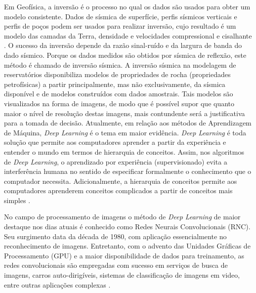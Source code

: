 Em Geofísica, a inversão é o processo no qual os dados são usados para obter um modelo
consistente. Dados de sísmica de superfície, perfis sísmicos verticais e
perfis de poços podem ser usados para realizar inversão, cujo
resultado é um modelo das camadas da Terra, densidade e velocidades compressional
e cisalhante \citep{WinNT}. O sucesso da inversão depende da razão sinal-ruído e da
largura de banda do dado sísmico. Porque os dados medidos são obtidos por sísmica de reflexão,
este método é chamado de inversão sísmica. A inversão sísmica na
modelagem de reservatórios disponibiliza modelos de propriedades de rocha
(propriedades petrofísicas) a partir principalmente, mas não exclusivamente,
da sísmica disponível e de modelos construídos com dados amostrais. Tais modelos
são visualizados na forma de imagens, de modo que é possível supor que quanto maior
o nível de resolução destas imagens, mais contundente será a justificativa para a tomada de decisão.
%
Atualmente, em relação aos métodos de Aprendizagem de Máquina, \textit{Deep Learning} é o tema em
maior evidência. \textit{Deep Learning} é toda solução que permite aos
computadores aprender a partir da experiência e entender o mundo em
termos de hierarquia de conceitos.
Assim, nos algoritmos de \textit{Deep Learning}, o aprendizado
por experiência (supervisionado) evita a interferência
humana no sentido de especificar formalmente o conhecimento que o computador necessita.
Adicionalmente, a hierarquia de conceitos permite aos computadores aprenderem
conceitos complicados a partir de conceitos mais simples \citep{Gdfl16}.

No campo de
processamento de imagens o método de \textit{Deep Learning} de
maior destaque nos dias atuais é conhecido
como Redes Neurais Convolucionais (RNC). Seu surgimento
data da década de 1980, com aplicação essencialmente no reconhecimento de imagens.
Entretanto, com o advento das Unidades Gráficas de Processamento (GPU) e a maior
disponibilidade de dados para treinamento, as redes convolucionais
são empregadas com sucesso em serviços de busca de imagens, carros auto-dirigíveis,
sistemas de classificação de imagens em video, entre outras aplicações complexas \citep[p. 50]{Buduma15}.

